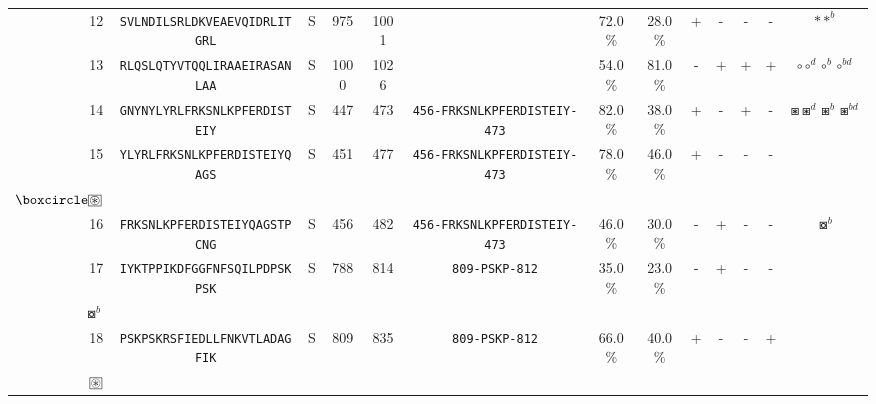 \begin{tabular}{rcccccccccccc}
12 &  \texttt{SVLNDILSRLDKVEAEVQIDRLITGRL} &       S &    975 &  1001 &                                                                  &                          72.0\% &                           28.0\% &          + &           - &          - &           - &                                                                                                                                $ \ast \ast^b $ \\
13 &  \texttt{RLQSLQTYVTQQLIRAAEIRASANLAA} &       S &   1000 &  1026 &                                                                  &                          54.0\% &                           81.0\% &          - &           + &          + &           + &                                                                                                           $ \circ \circ^d \circ^b \circ^{bd} $ \\
14 &  \texttt{GNYNYLYRLFRKSNLKPFERDISTEIY} &       S &    447 &   473 &  \texttt{{\scriptsize 456-}FRKSNLKPFERDISTEIY{\scriptsize -473}} &                          82.0\% &                           38.0\% &          + &           - &          + &           - &                                                                                                   $ \boxast \boxast^d \boxast^b \boxast^{bd} $ \\
15 &  \texttt{YLYRLFRKSNLKPFERDISTEIYQAGS} &       S &    451 &   477 &  \texttt{{\scriptsize 456-}FRKSNLKPFERDISTEIY{\scriptsize -473}} &                          78.0\% &                           46.0\% &          + &           - &          - &           - &           \Centerstack{  $\boxempty \boxempty^b \boxempty^d \boxempty^{bd}$ \\  $\boxcircle \setlength{\fboxsep}{0.5pt} \boxed{\circledast}$ } \\
16 &  \texttt{FRKSNLKPFERDISTEIYQAGSTPCNG} &       S &    456 &   482 &  \texttt{{\scriptsize 456-}FRKSNLKPFERDISTEIY{\scriptsize -473}} &                          46.0\% &                           30.0\% &          - &           + &          - &           - &                                                                                                                               $ \boxcircle^b $ \\
17 &  \texttt{IYKTPPIKDFGGFNFSQILPDPSKPSK} &       S &    788 &   814 &                \texttt{{\scriptsize 809-}PSKP{\scriptsize -812}} &                          35.0\% &                           23.0\% &          - &           + &          - &           - &                                                         \Centerstack{  $\boxempty \boxempty^b \boxempty^d \boxempty^{bd}$ \\  $\boxcircle^b$ } \\
18 &  \texttt{PSKPSKRSFIEDLLFNKVTLADAGFIK} &       S &    809 &   835 &                \texttt{{\scriptsize 809-}PSKP{\scriptsize -812}} &                          66.0\% &                           40.0\% &          + &           - &          - &           + &                             \Centerstack{  $\boxast \boxast^b \boxcircle \boxcircle^d$ \\  $\setlength{\fboxsep}{0.5pt} \boxed{\circledast}$ } \\
\bottomrule
\end{tabular}
